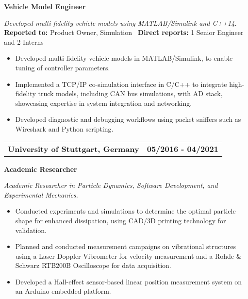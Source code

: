 \documentclass[a4paper,10pt]{article}
\begin{document}
\noindent
\colorbox{gray!40}{%
    \parbox{0.99\textwidth}{%
        \textcolor{highlightcolor}{\textbf{Vehicle Model Engineer}}
    }%
}

\vspace{0.2cm}
\noindent
\textit{Developed multi-fidelity vehicle models using MATLAB/Simulink and C++14.}\\

\vspace{-0.3cm}
\noindent
\textbf{Reported to:} Product Owner, Simulation \, \textbf{Direct reports:} 1 Senior Engineer and 2 Interns\,
\begin{itemize}[itemsep=0pt, topsep=5pt]
    \item Developed multi-fidelity vehicle models in MATLAB/Simulink, to enable tuning of controller parameters.
    \item Implemented a TCP/IP co-simulation interface in C/C++ to integrate
        high-fidelity truck models, including CAN bus simulations, with AD
        stack, showcasing expertise in system integration and networking.
    \item Developed diagnostic and debugging workflows using packet sniffers such as Wireshark and Python scripting.
\end{itemize}

\vspace{0.3cm}
\noindent
\begin{tabular}{ @{\hskip 0pt}m{} >{\raggedleft\arraybackslash}p{} }
    \noindent\textbf{University of Stuttgart, Germany} & \textbf{05/2016 - 04/2021}
\end{tabular}

\noindent
\colorbox{gray!40}{%
    \parbox{0.99\textwidth}{%
        \textcolor{highlightcolor}{\textbf{Academic Researcher}}
    }%
}

\vspace{0.2cm}
\noindent
\textit{Academic Researcher in Particle Dynamics, Software Development, and Experimental Mechanics.}\\
\vspace{-0.4cm}
\noindent
\begin{itemize}[itemsep=0pt, topsep=5pt]
    \item Conducted experiments and simulations to determine the optimal
        particle shape for enhanced dissipation, using CAD/3D printing
        technology for validation.
    \item Planned and conducted measurement campaigns on vibrational structures
        using a Laser-Doppler Vibrometer for velocity measurement and a Rohde \&
        Schwarz RTB200B Oscilloscope for data acquisition.
    \item Developed a Hall-effect sensor-based linear position measurement
        system on an Arduino embedded platform.
\end{itemize}
\end{document}
